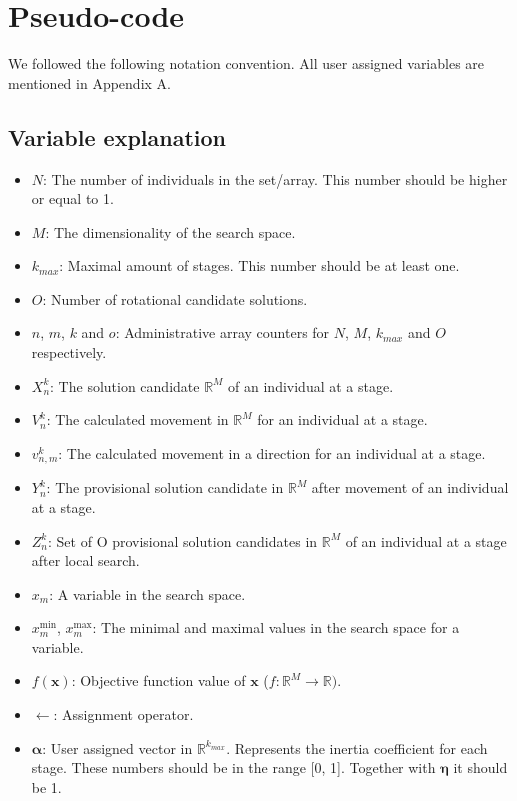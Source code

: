 \documentclass[runningheads]{llncs}
\begin{document}
\section{Pseudo-code}
\label{secPseu}
We followed the following notation convention. All user assigned variables are mentioned in Appendix A.
\subsection{Variable explanation}
\begin{itemize}
    \item $N$: The number of individuals in the set/array. This number should be higher or equal to 1.
    \item $M$: The dimensionality of the search space.
    \item $k_{max}$: Maximal amount of stages. This number should be at least one.
    \item $O$: Number of rotational candidate solutions.
    \item $n$, $m$, $k$ and $o$: Administrative array counters for $N$, $M$, $k_{max}$ and $O$ respectively.
    \item $X_n^k$: The solution candidate $\mathds{R}^M$ of an individual at a stage.
    \item $V_n^k$: The calculated movement in $\mathds{R}^M$ for an individual at a stage.
    \item $v_{n,m}^k$: The calculated movement in a direction for an individual at a stage.
    \item $Y_n^k$: The provisional solution candidate in $\mathds{R}^M$ after movement of an individual at a stage.
    \item $Z_n^{k}$: Set of O provisional solution candidates in $\mathds{R}^M$ of an individual at a stage after local search.
    \item $x_m$: A variable in the search space.
    \item $x_m^{\text{min}}$, $x_m^{\text{max}}$: The minimal and maximal values in the search space for a variable.
    \item $f(\mathbf{x})$: Objective function value of $\mathbf{x}$ ($f: \mathds{R}^M \rightarrow \mathds{R})$.
    \item $\leftarrow$: Assignment operator.
    \item $\boldsymbol{\alpha}$: User assigned vector in $\mathds{R}^{k_{max}}$. Represents the inertia coefficient for each stage. These numbers should be in the range [0, 1]. Together with $\boldsymbol{\eta}$ it should be 1.

\end{itemize}
\end{document}
